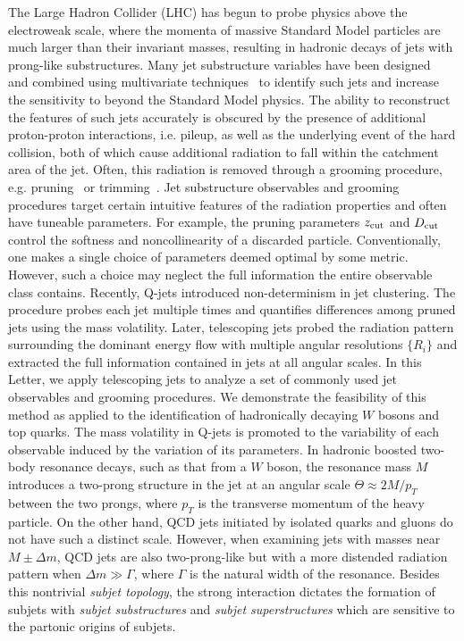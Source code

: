 \documentclass[aps,prl,floatfix,preprintnumbers,twocolumn,groupedaddress,nofootinbib]{revtex4-1}
\begin{document}
The Large Hadron Collider (LHC) has begun to probe physics above the electroweak scale, where the momenta of massive Standard Model particles are much larger than their invariant masses, resulting in hadronic decays of jets with prong-like substructures. Many jet substructure variables have been designed~\cite{Abdesselam:2010pt,Altheimer:2012mn,Altheimer:2013yza} and combined using multivariate techniques~\cite{Adams:2015hiv,Larkoski:2017jix,ATLAS-CONF-2017-064,Khachatryan:1955546} to identify such jets and increase the sensitivity to beyond the Standard Model physics. The ability to reconstruct the features of such jets accurately is obscured by the presence of additional proton-proton interactions, i.e. pileup, as well as the underlying event of the hard collision, both of which cause additional radiation to fall within the catchment area of the jet. Often, this radiation is removed through a grooming procedure, e.g. pruning~\cite{Ellis:2009su} or trimming~\cite{Krohn:2009th}. Jet substructure observables and grooming procedures target certain intuitive features of the radiation properties and often have tuneable parameters. For example, the pruning parameters $z_{\rm cut}$ and $D_{\rm cut}$ control the softness and noncollinearity of a discarded particle. Conventionally, one makes a single choice of parameters deemed optimal by some metric. However, such a choice may neglect the full information the entire observable class contains.
\newline \indent Recently, Q-jets \cite{Ellis:2012sn} introduced non-determinism in jet clustering. The procedure probes each jet multiple times and quantifies differences among pruned jets using the mass volatility. Later, telescoping jets \cite{Chien:2014hla} probed the radiation pattern surrounding the dominant energy flow with multiple angular resolutions $\{R_i\}$ and extracted the full information contained in jets at all angular scales. In this Letter, we apply telescoping jets to analyze a set of commonly used jet observables and grooming procedures. We demonstrate the feasibility of this method as applied to the identification of hadronically decaying $W$ bosons and top quarks. The mass volatility in Q-jets is promoted to the variability of each observable induced by the variation of its parameters.
\newline \indent In hadronic boosted two-body resonance decays, such as that from a $W$ boson, the resonance mass $M$ introduces a two-prong structure in the jet at an angular scale $\Theta\approx 2M/p_T$ between the two prongs, where $p_T$ is the transverse momentum of the heavy particle. On the other hand, QCD jets initiated by isolated quarks and gluons do not have such a distinct scale. However, when examining jets with masses near $M\pm\Delta m$, QCD jets are also two-prong-like but with a more distended radiation pattern when $\Delta m\gg\Gamma$, where $\Gamma$ is the natural width of the resonance. Besides this nontrivial {\sl subjet topology}, the strong interaction dictates the formation of subjets with {\sl subjet substructures} and {\sl subjet superstructures} \cite{Gallicchio:2010sw} which are sensitive to the partonic origins of subjets.
\end{document}
